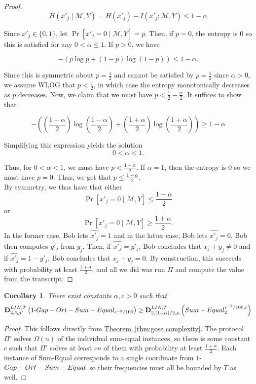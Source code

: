 \documentclass[11pt]{article}
\numberwithin{equation}{section}
\newtheorem{corollary}[theorem]{Corollary}
\theoremstyle{definition}
\theoremstyle{plain}
\newcommand{\expref}[2]{\hyperref[#2]{#1~\ref{#2}}}
\newcommand{\DlinT}{\ensuremath{\mathbf{D}^{LIN,T}}}
\newcommand{\sumequal}{\textsc{Sum-Equal} }
\newcommand{\gose}{\textsc{Gap-Ort-Sum-Equal}}
\begin{document}
\begin{proof}
$$H(x'_j \mid \mathcal{M},Y) = H(x'_j) - I(x'_j; \mathcal{M},Y) \le 1-\alpha$$

Since $x'_j \in \{0,1\}$, let $\Pr[x'_j = 0 \mid \mathcal{M},Y] = p$. Then, if $p=0$, the entropy is $0$ so this is satisfied for any $0 < \alpha \le 1$. If $p>0$, we have

$$-(p \log p + (1-p) \log (1-p))\le 1-\alpha.$$

Since this is symmetric about $p=\frac{1}{2}$ and cannot be satisfied by $p = \frac{1}{2}$ since $\alpha > 0$, we assume WLOG that $p < \frac{1}{2}$, in which case the entropy monotonically decreases as $p$ decreases. Now, we claim that we must have $p < \frac{1}{2}-\frac{\alpha}{2}$. It suffices to show that

$$ -\left(\left(\frac{1-\alpha}{2}\right) \log \left(\frac{1-\alpha}{2}\right) + \left(\frac{1+\alpha}{2}\right) \log \left(\frac{1+\alpha}{2}\right)\right) \ge 1-\alpha$$

Simplifying this expression yields the solution
$$0 < \alpha < 1.$$

Thus, for $0 < \alpha < 1$, we must have $p < \frac{1-\alpha}{2}$. If $\alpha=1$, then the entropy is $0$ so we must have $p=0$. Thus, we get that $p \le \frac{1-\alpha}{2}$.\\

By symmetry, we thus have that either
$$\Pr[x'_j = 0 \mid \mathcal{M},Y] \le \frac{1-\alpha}{2}$$
or
$$\Pr[x'_j = 0 \mid \mathcal{M},Y] \ge \frac{1+\alpha}{2}.$$
In the former case, Bob lets $\hat{x'_j} = 1$ and in the latter case, Bob lets $\hat{x'_j} = 0$. Bob then computes $y'_j$ from $y_j$. Then, if $\hat{x'_j} = y'_j$, Bob concludes that $x_j + y_j \ne 0$ and if $\hat{x'_j} = 1-y'_j$, Bob concludes that $x_j + y_j = 0$. By construction, this succeeds with probability at least $\frac{1+\alpha}{2}$, and all we did was run $\Pi$ and compute the value from the transcript.
\end{proof}


\begin{corollary}
{\color{black}There exist constants $\alpha,c > 0$ such that}
$$\DlinT_{2,\delta,\mu'}\left(1\text{-}\gose_{\epsilon^{-2}/100}\right) \ge \DlinT_{2,(1+\alpha)/2,\mu}\left(\sumequal^{\epsilon^{-2}/100,c}_2\right)$$
\end{corollary}

\begin{proof}
This follows directly from \expref{Theorem}{thm:gose complexity}. The protocol $\Pi'$ solves $\Omega(n)$ of the individual sum-equal instances, so there is some constant $c$ such that $\Pi'$ solves at least $cn$ of them with probability at least $\frac{1+\alpha}{2}$. Each instance of Sum-Equal corresponds to a single coordinate from $1$-$\gose$ so their frequencies must all be bounded by $T$ as well.
\end{proof}
\end{document}
